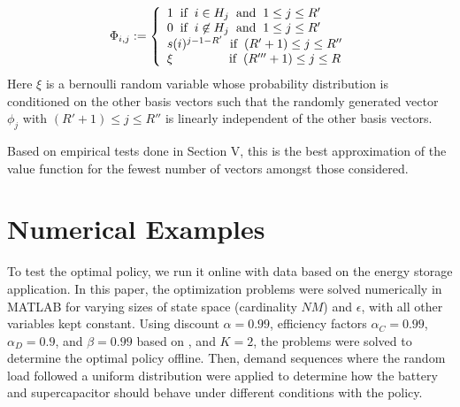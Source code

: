 \documentclass[conference]{IEEEtran}
\begin{document}
    \begin{displaymath}
        \Phi_{i,j}:=\left\{
            \begin{array}{l}
            1 \hspace{0.2cm} \text{if} \hspace{0.2cm} i\in H_{j} \hspace{0.2cm} \text{and} \hspace{0.2cm} 1\leq j\leq R'\\
            0 \hspace{0.2cm} \text{if} \hspace{0.2cm} i\not\in H_{j} \hspace{0.2cm} \text{and} \hspace{0.2cm} 1\leq j\leq R'\\
            s(i)^{j-1-R'} \hspace{0.2cm} \text{if} \hspace{0.2cm} (R'+1)\leq j\leq R''\\
            \xi \hspace{1.6cm} \text{if} \hspace{0.2cm} (R'''+1)\leq j\leq R
            \end{array}
            \right.
    \end{displaymath} Here $\xi$ is a bernoulli random variable whose probability distribution is conditioned on the other basis vectors such that the randomly generated vector $\phi_{j}$ with $(R'+1)\leq j\leq R''$ is linearly independent of the other basis vectors.
    
    Based on empirical tests done in Section V, this is the best approximation of the value function for the fewest number of vectors amongst those considered.

    

\section{Numerical Examples}
To test the optimal policy, we run it online with data based on the energy storage application. In this paper, the optimization problems were solved numerically in MATLAB for varying sizes of state space (cardinality $NM$) and $\epsilon$, with all other variables kept constant. Using discount $\alpha=0.99$, efficiency factors $\alpha_{C}=0.99$, $\alpha_{D}=0.9$, and $\beta=0.99$ based on \cite{su2013modeling}, and $K=2$, the problems were solved to determine the optimal policy offline. Then, demand sequences where the random load followed a uniform distribution were applied to determine how the battery and supercapacitor should behave under different conditions with the policy.
\end{document}
